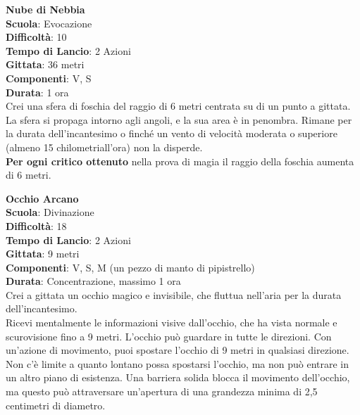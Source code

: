 \begin{multicols}{2}
\medskip\textbf{Nube di Nebbia}\\
\textbf{Scuola}: Evocazione\\
\textbf{Difficoltà}:  10\\
\textbf{Tempo di Lancio}: 2 Azioni\\
\textbf{Gittata}: 36 metri\\
\textbf{Componenti}: V, S\\
\textbf{Durata}: 1 ora\\
Crei una sfera di foschia del raggio di 6 metri centrata su di un punto a gittata. La sfera si propaga intorno agli angoli, e la sua area è in penombra. Rimane per la durata dell'incantesimo o finché un vento di velocità moderata o superiore (almeno 15 chilometriall'ora)  non la disperde.\\
\textbf{Per ogni critico ottenuto} nella prova di magia il raggio della foschia aumenta di 6 metri.

\medskip\textbf{Occhio Arcano}\\
\textbf{Scuola}: Divinazione\\
\textbf{Difficoltà}:  18\\
\textbf{Tempo di Lancio}: 2 Azioni\\
\textbf{Gittata}: 9 metri\\
\textbf{Componenti}: V, S, M (un pezzo di manto di pipistrello)\\
\textbf{Durata}: Concentrazione, massimo 1 ora\\
Crei a gittata un occhio magico e invisibile, che fluttua nell'aria per la durata dell'incantesimo.\\
Ricevi mentalmente le informazioni visive dall'occhio, che ha vista normale e scurovisione fino a 9 metri. L’occhio può guardare in tutte le direzioni. Con un'azione di movimento, puoi spostare l’occhio di 9 metri in qualsiasi direzione. Non c’è limite a quanto lontano possa spostarsi l’occhio, ma non può entrare in un altro piano di esistenza. Una barriera solida blocca il movimento dell'occhio, ma questo può attraversare un'apertura di una grandezza minima di 2,5 centimetri di diametro.


\end{multicols}
